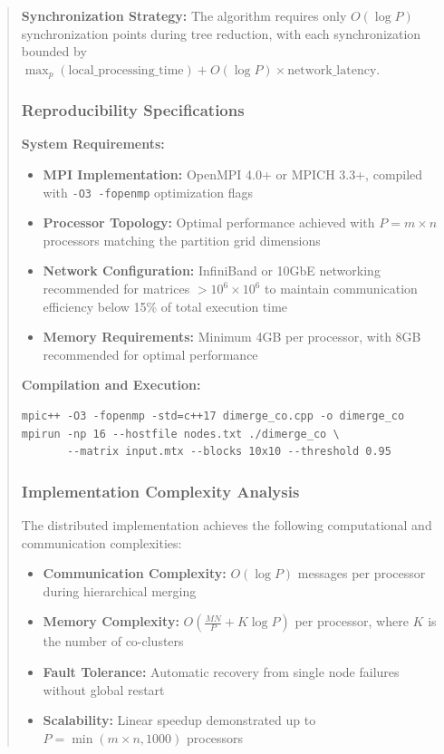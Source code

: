 \documentclass{ar2rc}
\begin{document}
\begin{quote}
\textbf{Synchronization Strategy:} The algorithm requires only $O(\log P)$ synchronization points during tree reduction, with each synchronization bounded by $\max_p(\text{local\_processing\_time}) + O(\log P) \times \text{network\_latency}$.

\subsubsection{Reproducibility Specifications}

\textbf{System Requirements:}
\begin{itemize}
\item \textbf{MPI Implementation:} OpenMPI 4.0+ or MPICH 3.3+, compiled with \texttt{-O3 -fopenmp} optimization flags
\item \textbf{Processor Topology:} Optimal performance achieved with $P = m \times n$ processors matching the partition grid dimensions
\item \textbf{Network Configuration:} InfiniBand or 10GbE networking recommended for matrices $> 10^6 \times 10^6$ to maintain communication efficiency below 15\% of total execution time
\item \textbf{Memory Requirements:} Minimum 4GB per processor, with 8GB recommended for optimal performance
\end{itemize}

\textbf{Compilation and Execution:}
\begin{verbatim}
mpic++ -O3 -fopenmp -std=c++17 dimerge_co.cpp -o dimerge_co
mpirun -np 16 --hostfile nodes.txt ./dimerge_co \
       --matrix input.mtx --blocks 10x10 --threshold 0.95
\end{verbatim}

\subsubsection{Implementation Complexity Analysis}

The distributed implementation achieves the following computational and communication complexities:
\begin{itemize}
\item \textbf{Communication Complexity:} $O(\log P)$ messages per processor during hierarchical merging
\item \textbf{Memory Complexity:} $O(\frac{MN}{P} + K \log P)$ per processor, where $K$ is the number of co-clusters
\item \textbf{Fault Tolerance:} Automatic recovery from single node failures without global restart
\item \textbf{Scalability:} Linear speedup demonstrated up to $P = \min(m \times n, 1000)$ processors
\end{itemize}


\end{quote}
\end{document}
